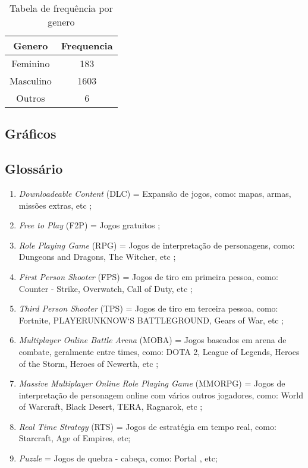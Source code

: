 \documentclass[11pt,a4paper]{article}
\begin{document}
\begin{table}[h!]
 \begin{center}
\begin{tabular}{c|c}
\hline
Genero & Frequencia\\
\hline
Feminino & 183\\
\hline
Masculino & 1603\\
\hline
Outros & 6\\
\hline
\end{tabular}
    \caption{Tabela de frequência por genero}
     \label{table:2}
  \end{center}
\end{table}

\subsection{Gráficos}
\subsection{Glossário}

\begin{enumerate}[label=(\roman*)]
\item \textit{Downloadeable Content} (DLC) = Expansão de jogos, como: mapas, armas, missões extras, etc ;
\item \textit{Free to Play} (F2P) = Jogos gratuitos ;
\item \textit{Role Playing Game} (RPG) = Jogos de interpretação de personagens, como: Dungeons and Dragons, The Witcher, etc ;
\item \textit{First Person Shooter} (FPS) = Jogos de tiro em primeira pessoa, como: Counter - Strike, Overwatch, Call of Duty, etc ;
\item \textit{Third Person Shooter} (TPS) = Jogos de tiro em terceira pessoa, como: Fortnite, PLAYERUNKNOW`S BATTLEGROUND, Gears of War, etc ;
\item \textit{Multiplayer Online Battle Arena} (MOBA) = Jogos baseados em arena de combate, geralmente entre times, como: DOTA 2, League of Legends, Heroes of the Storm, Heroes of Newerth, etc ;
\item \textit{Massive Multiplayer Online Role Playing Game} (MMORPG) = Jogos de interpretação de personagem online com vários outros jogadores, como: World of Warcraft, Black Desert, TERA, Ragnarok, etc ;
\item \textit{Real Time Strategy} (RTS) = Jogos de estratégia em tempo real, como: Starcraft, Age of Empires, etc;
\item \textit{Puzzle} = Jogos de quebra - cabeça, como: Portal , etc;
\end{enumerate}
\end{document}
